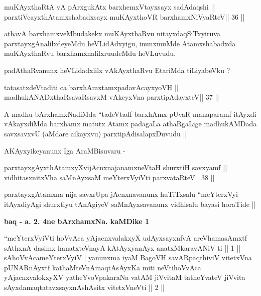 \begin{shl}
muKAyxthaRtA vA pArxgukAtx barxhemxVtayxsayx sadAdaqshi ||
parxtiVcayxthA\s\s tamxshabadxsayx muKAyxthoVR barxhamxNiVyaRteV\hfill || 36 ||
\end{shl}

\begin{artha}
athavA barxhamxveMbudakekx muKAyxthaRvu nitayxdaqSiTxyiruva
parxtayxgAnalilxdeyeMdu heVLidAdxyigu, inunxmuMde Atamxshabadxda
muKAyxthaRvu barxhamxnalilxruudeMdu heVLuvudu.

padAthaRvanunx heVLidadxlilx vAkAyxthaRvu EtariMda tiLiyabeVku ?
\end{artha}

\begin{shl}
tatasatxdeVtaditi ca barxhAmxtamxpadavAcayxyoVH ||
madhukANADxthaRsavaRsavxM vAkeyxVna parxtipAdayxteV\hfill || 37 ||
\end{shl}

\begin{artha}
A madhu bArxhamxNadiMda ``tadeVtadf barxhAmx pUvaR manaparamf itAyxdi
vAkayxdiMda barxhamx matutx Atamx padagaLa athaRgaLige madhukAMDada
savxsavxvU (aMdare aikayxvu) parxtipAdisalapxDuvudu ||

AKAyxyikeyanunx Iga AraMBisuvaru -
\end{artha}

\begin{shl}
parxtayxgAyxthAtamxyXvijAcnxnajanamxneV\s taH shurxtiH savxyamf ||
vidhitasxnitxVha saMnAyxsaM meYterxVyiVti parxvataRteV\hfill || 38 ||
\end{shl}

\begin{artha}
parxtayxgAtamxna nija savxrUpa jAcnxnavanunx huTiTxsalu ``meYterxVyi
itAyxdiyAgi shurxtiyu tAnAgiyeV saMnAyxsavanunx vidhisalu bayasi
horaTide ||
\end{artha}

\begin{center}
\textbf{baq - a. 2. 4ne bArxhamxNa. kaMDike 1}
\end{center}

\begin{shl}
``meYterxVyiVti hoVvAca yAjacnxvalakxyX udAyxsayxnfvA 
areV\s hamasAmxtf sAthxnA dasimx hanatxteV\s nayA
kAtAyxyanAyx anatxMkaravANiV ti || 1 ||
sAhoVvAcameYterxVyiV | yanunxma iyaM BagoVH
savARpaqthiviV vitetxVna pUNARnAyxtf kathaMteVnA\s maqtAsAyxKa
miti neVtihoVvAca yAjacnxvalokxyXV yatheYvoVpakaraNa
vatAM jiVvitaM tatheYvateV jiVvita sAyxdamaqtatavxsayxnAshAsitx
vitetxVneVti || 2 ||
\end{shl}

